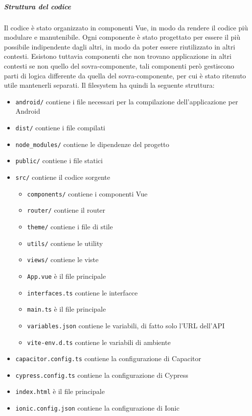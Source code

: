 \documentclass[a4paper]{article}
\begin{document}
\subparagraph{Struttura del codice}
Il codice è stato organizzato in componenti Vue, in modo da rendere il codice più modulare e manutenibile. Ogni componente è stato progettato per essere il più possibile indipendente dagli altri, in modo da poter essere riutilizzato in altri contesti. Esistono tuttavia componenti che non trovano applicazione in altri contesti se non quello del sovra-componente, tali componenti però gestiscono parti di logica differente da quella del sovra-componente, per cui è stato ritenuto utile mantenerli separati.
Il filesystem ha quindi la seguente struttura:
\begin{itemize}
	\item \texttt{android/} contiene i file necessari per la compilazione dell'applicazione per Android
	\item \texttt{dist/} contiene i file compilati
	\item \texttt{node\_modules/} contiene le dipendenze del progetto
	\item \texttt{public/} contiene i file statici
	\item \texttt{src/} contiene il codice sorgente
		\begin{itemize}
			\item \texttt{components/} contiene i componenti Vue
			\item \texttt{router/} contiene il router
			\item \texttt{theme/} contiene i file di stile
			\item \texttt{utils/} contiene le utility
			\item \texttt{views/} contiene le viste
			\item \texttt{App.vue} è il file principale
			\item \texttt{interfaces.ts} contiene le interfacce
			\item \texttt{main.ts} è il file principale
			\item \texttt{variables.json} contiene le variabili, di fatto solo l'URL dell'API
			\item \texttt{vite-env.d.ts} contiene le variabili di ambiente
		\end{itemize}
	\item \texttt{capacitor.config.ts} contiene la configurazione di Capacitor
	\item \texttt{cypress.config.ts} contiene la configurazione di Cypress
	\item \texttt{index.html} è il file principale
	\item \texttt{ionic.config.json} contiene la configurazione di Ionic

\end{itemize}
\end{document}
